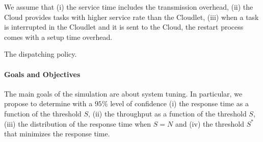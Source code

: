 We assume that 
(i) the service time includes the transmission overhead,
(ii) the Cloud provides tasks with higher service rate than the Cloudlet, 
(iii) when a task is interrupted in the Cloudlet and it is sent to the Cloud, the restart process comes with a setup time overhead.

\begin{algorithm}
	\label{alg:modeling-dispatching-policy}
	\SetAlgoLined
	\caption{The dispatching policy.}
\end{algorithm}


\paragraph{Goals and Objectives}
The main goals of the simulation are about system tuning.
In particular, we propose to determine with a $95\%$ level of confidence
(i) the response time as a function of the threshold $S$,
(ii) the throughput as a function of the threshold $S$,
(iii) the distribution of the response time when $S=N$ and
(iv) the threshold $S^{*}$ that minimizes the response time.

